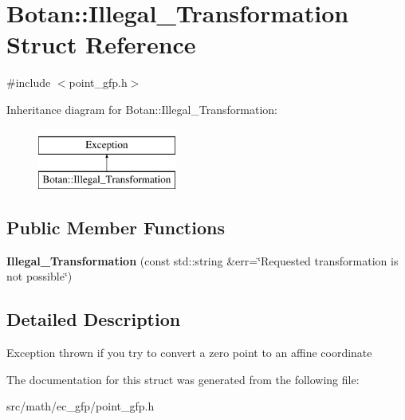 \hypertarget{structBotan_1_1Illegal__Transformation}{\section{Botan\-:\-:Illegal\-\_\-\-Transformation Struct Reference}
\label{structBotan_1_1Illegal__Transformation}
}


{\ttfamily \#include $<$point\-\_\-gfp.\-h$>$}

Inheritance diagram for Botan\-:\-:Illegal\-\_\-\-Transformation\-:\begin{figure}[H]
\begin{center}
\leavevmode
\includegraphics[height=2.000000cm]{structBotan_1_1Illegal__Transformation}
\end{center}
\end{figure}
\subsection*{Public Member Functions}
\begin{DoxyCompactItemize}
\item 
\hypertarget{structBotan_1_1Illegal__Transformation_ad7d96df56c85086d94ea766d6843ad5f}{{\bfseries Illegal\-\_\-\-Transformation} (const std\-::string \&err=\char`\"{}Requested transformation is not possible\char`\"{})}\label{structBotan_1_1Illegal__Transformation_ad7d96df56c85086d94ea766d6843ad5f}

\end{DoxyCompactItemize}


\subsection{Detailed Description}
Exception thrown if you try to convert a zero point to an affine coordinate 

The documentation for this struct was generated from the following file\-:\begin{DoxyCompactItemize}
\item 
src/math/ec\-\_\-gfp/point\-\_\-gfp.\-h\end{DoxyCompactItemize}
